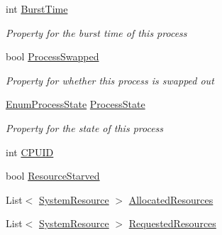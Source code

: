 \begin{DoxyCompactItemize}
int \hyperlink{class_c_p_u___o_s___simulator_1_1_operating___system_1_1_simulator_process_a5a340d3421e4251b758752de009b7758}{Burst\+Time}
\begin{DoxyCompactList}\small\item\em Property for the burst time of this process \end{DoxyCompactList}\item 
bool \hyperlink{class_c_p_u___o_s___simulator_1_1_operating___system_1_1_simulator_process_a7886e0890797887fcdd65b6eac62cfc0}{Process\+Swapped}
\begin{DoxyCompactList}\small\item\em Property for whether this process is swapped out \end{DoxyCompactList}\item 
\hyperlink{namespace_c_p_u___o_s___simulator_1_1_operating___system_a836ee2204e78fcb3a7dd6c3c942b1a24}{Enum\+Process\+State} \hyperlink{class_c_p_u___o_s___simulator_1_1_operating___system_1_1_simulator_process_a388763de47e217fd742858413c5b169f}{Process\+State}
\begin{DoxyCompactList}\small\item\em Property for the state of this process \end{DoxyCompactList}\item 
int \hyperlink{class_c_p_u___o_s___simulator_1_1_operating___system_1_1_simulator_process_a456868adfff49f66200bb95a7b64a182}{C\+P\+U\+I\+D}
\item 
bool \hyperlink{class_c_p_u___o_s___simulator_1_1_operating___system_1_1_simulator_process_a6475f63c13feaefb3a5fbfc349ad4f2f}{Resource\+Starved}
\item 
List$<$ \hyperlink{class_c_p_u___o_s___simulator_1_1_operating___system_1_1_system_resource}{System\+Resource} $>$ \hyperlink{class_c_p_u___o_s___simulator_1_1_operating___system_1_1_simulator_process_aec7c34074384aa76d0687edd65389c95}{Allocated\+Resources}
\item 
List$<$ \hyperlink{class_c_p_u___o_s___simulator_1_1_operating___system_1_1_system_resource}{System\+Resource} $>$ \hyperlink{class_c_p_u___o_s___simulator_1_1_operating___system_1_1_simulator_process_aa21683a94c1356359917ee67e46bd0fb}{Requested\+Resources}

\end{DoxyCompactItemize}
